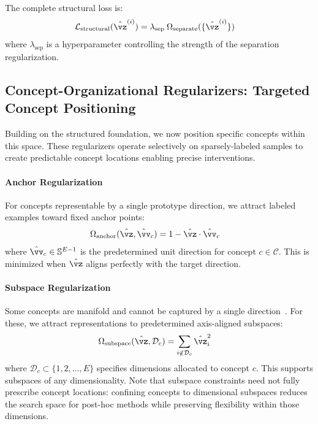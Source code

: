 The complete structural loss is:
\begin{align}
    \mathcal{L}_{\text{structural}}(\hat{\vz}^{(i)}) &= \lambda_{\text{sep}} \: \Omega_{\text{separate}}(\{\hat{\vz}^{(i)}\}) \label{eq:structural_loss}
\end{align}
where $\lambda_{\text{sep}}$ is a hyperparameter controlling the strength of the separation regularization.

%

\subsection{Concept-Organizational Regularizers: Targeted Concept Positioning}

Building on the structured foundation, we now position specific concepts within this space. These regularizers operate selectively on sparsely-labeled samples to create predictable concept locations enabling precise interventions.

\paragraph{Anchor Regularization}
For concepts representable by a single prototype direction, we attract labeled examples toward fixed anchor points:
\begin{align}
    \Omega_{\text{anchor}}(\hat{\vz}, \hat{\vv}_c) &= 1 - \hat{\vz} \cdot \hat{\vv}_c \label{eq:anchor}
\end{align}
where $\hat{\vv}_c \in \mathbb{S}^{E-1}$ is the predetermined unit direction for concept $c \in \mathcal{C}$. This is minimized when $\hat{\vz}$ aligns perfectly with the target direction.

\paragraph{Subspace Regularization}
Some concepts are manifold and cannot be captured by a single direction~\citep{engels2025languagemodelfeaturesonedimensionally}. For these, we attract representations to predetermined axis-aligned subspaces:
\begin{align}
    \Omega_{\text{subspace}}(\hat{\vz}, \mathcal{D}_c) &= \sum_{i \notin \mathcal{D}_c} \hat{\vz}_i^2 \label{eq:subspace}
\end{align}
where $\mathcal{D}_c \subset \{1, 2, \ldots, E\}$ specifies dimensions allocated to concept $c$. This supports subspaces of any dimensionality. Note that subspace constraints need not fully prescribe concept locations: confining concepts to dimensional subspaces reduces the search space for post-hoc methods while preserving flexibility within those dimensions.

